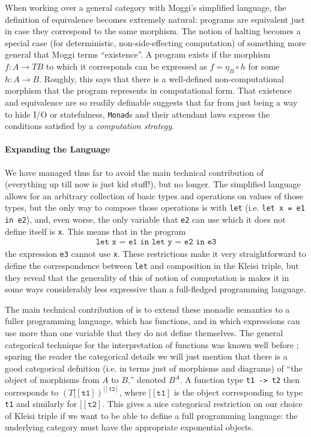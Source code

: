 \documentclass{article}
\renewcommand{\[}{\begin{eqnarray*}}
\renewcommand{\]}{\end{eqnarray*}}
\theoremstyle{definition}
\newcommand{\sembrack}[1]{[\![#1]\!}
\begin{document}
When working over a general category with Moggi's simplified language, the
definition of equivalence becomes extremely natural: programs are equivalent
just in case they correspond to the same morphism. The notion of halting becomes
a special case (for deterministic, non-side-effecting computation) of something
more general that Moggi terms ``existence''. A program exists if the morphism
$f: A \rightarrow TB$ to which it corresponds can be expressed as $f = \eta_B
\circ h$ for some $h: A \rightarrow B$. Roughly, this says that there is a
well-defined non-computational morphism that the program represents in
computational form. That existence and equivalence are so readily definable
suggests that far from just being a way to hide I/O or statefulness,
\texttt{Monad}s and their attendant laws express the conditions satisfied by a
\emph{computation strategy}.

\paragraph{Expanding the Language} We have managed thus far to avoid the main
technical contribution of \cite{moggi89} (everything up till now is just kid
stuff!), but no longer. The simplified language allows for an arbitrary
collection of basic types and operations on values of those types, but the only
way to compose those operations is with \texttt{let} (i.e. \texttt{let x = e1 in
e2}), and, even worse, the only variable that \texttt{e2} can use which it does
not define itself is \texttt{x}. This means that in the program 
\[
  \texttt{let x = e1 in let y = e2 in e3}
\] 
the expression \texttt{e3} cannot use \texttt{x}. These restrictions make it
very straightforward to define the correspondence between \texttt{let} and
composition in the Kleisi triple, but they reveal that the generality of this of
notion of computation is makes it in some ways considerably less expressive than
a full-fledged programming language.

The main technical contribution of \cite{moggi89} is to extend these monadic
semantics to a fuller programming language, which has functions, and in which
expressions can use more than one variable that they do not define themselves.
The general categorical technique for the interpretation of functions was known
well before \cite{moggi89}; sparing the reader the categorical details we will
just mention that there is a good categorical defnition (i.e. in terms just of
morphisms and diagrams) of ``the object of morphisms from $A$ to $B$,'' denoted
$B^A$. A function type \texttt{t1 -> t2} then corresponds to
$(T\sembrack{\texttt{t1}})^{\sembrack{\texttt{t2}}}$, where
$\sembrack{\texttt{t1}}$ is the object corresponding to type \texttt{t1} and
similarly for $\sembrack{\texttt{t2}}$.
This gives a nice
categorical restriction on our choice of Kleisi triple if we want to be able to
define a full programming language: the underlying category must have the
appropriate exponential objects.
\end{document}
